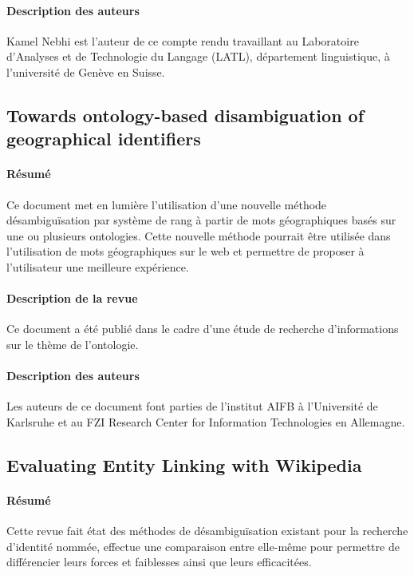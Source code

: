 \documentclass{article}
\begin{document}
\paragraph{Description des auteurs}

Kamel Nebhi est l'auteur de ce compte rendu travaillant au Laboratoire d'Analyses et de Technologie du Langage (LATL), département linguistique, à l'université de Genève en Suisse.

\subsection{Towards ontology-based disambiguation of geographical identifiers\cite{article-3}}


\paragraph{Résumé}
Ce document met en lumière l'utilisation d'une nouvelle méthode désambiguïsation par système de rang à partir de mots géographiques basés sur une ou plusieurs ontologies. Cette nouvelle méthode pourrait être utilisée dans l'utilisation de mots géographiques sur le web et permettre de proposer à l'utilisateur une meilleure expérience. 

\paragraph{Description de la revue}
Ce document a été publié dans le cadre d'une étude de recherche d'informations sur le thème de l'ontologie.

\paragraph{Description des auteurs}

Les auteurs de ce document font parties de l'institut AIFB à l'Université de Karlsruhe et au FZI Research Center for Information Technologies en Allemagne.

\subsection{Evaluating Entity Linking with Wikipedia\cite{article-7}}

\paragraph{Résumé}
Cette revue fait état des méthodes de désambiguïsation existant pour la recherche d'identité nommée, effectue une comparaison entre elle-même pour permettre de différencier leurs forces et faiblesses ainsi que leurs efficacitées.
\end{document}
